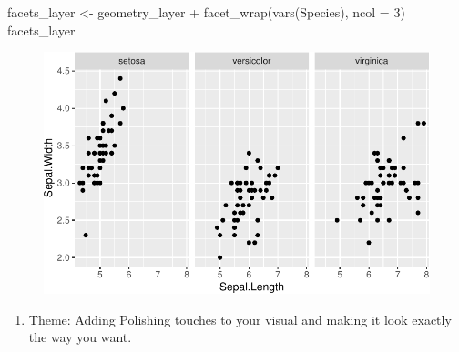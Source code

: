 \documentclass[
  letterpaper,
]{book}
\newenvironment{Shaded}{\begin{snugshade}}{\end{snugshade}}
\newcommand{\AttributeTok}[1]{\textcolor[rgb]{0.40,0.45,0.13}{#1}}
\newcommand{\DecValTok}[1]{\textcolor[rgb]{0.68,0.00,0.00}{#1}}
\newcommand{\FunctionTok}[1]{\textcolor[rgb]{0.28,0.35,0.67}{#1}}
\newcommand{\NormalTok}[1]{\textcolor[rgb]{0.00,0.23,0.31}{#1}}
\newcommand{\OtherTok}[1]{\textcolor[rgb]{0.00,0.23,0.31}{#1}}
\newcommand{\SpecialCharTok}[1]{\textcolor[rgb]{0.37,0.37,0.37}{#1}}
\providecommand{\tightlist}{%
  \setlength{\itemsep}{0pt}\setlength{\parskip}{0pt}}\usepackage{longtable,booktabs,array}
\begin{document}
\begin{Shaded}
\begin{Highlighting}[]
\NormalTok{facets\_layer }\OtherTok{\textless{}{-}}\NormalTok{ geometry\_layer }\SpecialCharTok{+} \FunctionTok{facet\_wrap}\NormalTok{(}\FunctionTok{vars}\NormalTok{(Species), }\AttributeTok{ncol =} \DecValTok{3}\NormalTok{) }
\NormalTok{facets\_layer}
\end{Highlighting}
\end{Shaded}

\begin{figure}[H]

{\centering \includegraphics{./data_viz_files/figure-pdf/unnamed-chunk-11-1.pdf}

}

\end{figure}

\begin{enumerate}
\def\labelenumi{\arabic{enumi}.}
\setcounter{enumi}{6}
\tightlist
\item
  Theme: Adding Polishing touches to your visual and making it look
  exactly the way you want.
\end{enumerate}
\end{document}
